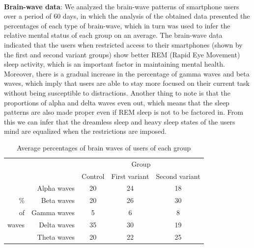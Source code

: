 \documentclass{article}
\begin{document}
\paragraph{} \textbf{Brain-wave data}: We analyzed the brain-wave patterns of smartphone users over a period of 60 days, in which the analysis of the obtained data presented the percentages of each type of brain-wave, which in turn was used to infer the relative mental status of each group on an average. The brain-wave data indicated that the users when restricted access to their smartphones (shown by the first and second variant groups) show better REM (Rapid Eye Movement) sleep activity, which is an important factor in maintaining mental health. Moreover, there is a gradual increase in the percentage of gamma waves and beta waves, which imply that users are able to stay more focused on their current task without being susceptible to distractions. Another thing to note is that the proportions of alpha and delta waves even out, which means that the sleep patterns are also made proper even if REM sleep is not to be factored in. From this we can infer that the dreamless sleep and heavy sleep states of the users mind are equalized when the restrictions are imposed.

\begin{table}[htbp]
  \begin{center}
    \begin{tabular}{|rr|c|c|c|}
      \hline
      \multicolumn{1}{|l}{}       & \multicolumn{1}{l|}{} & \multicolumn{3}{c|}{Group}               \\ \cline{3-5} 
                                  & \multicolumn{1}{c|}{} & Control & First variant & Second variant \\ \hline
      \multicolumn{1}{|r|}{}      & Alpha waves           & 20      & 24            & 18             \\ \cline{2-5} 
      \multicolumn{1}{|r|}{\%}    & Beta waves            & 20      & 26            & 30             \\ \cline{2-5} 
      \multicolumn{1}{|r|}{of}    & Gamma waves           & 5       & 6             & 8              \\ \cline{2-5} 
      \multicolumn{1}{|r|}{waves} & Delta waves           & 35      & 30            & 19             \\ \cline{2-5} 
      \multicolumn{1}{|r|}{}      & Theta waves           & 20      & 22            & 25             \\ \hline
    \end{tabular}
    \caption{Average percentages of brain waves of users of each group}
    \label{tab:tabtwo}
  \end{center}
\end{table}
\end{document}
